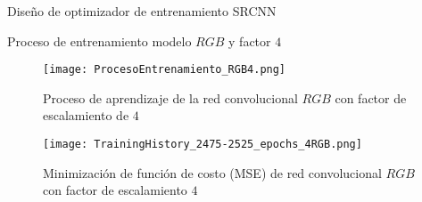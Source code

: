 \begin{frame}{Diseño de optimizador de entrenamiento SRCNN}
    \begin{table}[H]
        \centering
        \caption{Parámetros de entrenamiento del optimizador \textbf{Adam}}
    \end{table}
\end{frame}

\begin{frame}{Proceso de entrenamiento modelo $RGB$ y factor $4$}
    \begin{figure}[H]
        \centering
        \texttt{[image: ProcesoEntrenamiento\_RGB4.png]}
        \caption{Proceso de aprendizaje de la red convolucional $RGB$ con factor de escalamiento de $4$}
        \label{fig:SRCNN_MSE_TrainingProcess4RGB}
    \end{figure}
    \begin{figure}[H]
        \centering
        \texttt{[image: TrainingHistory\_2475-2525\_epochs\_4RGB.png]}
        \caption{Minimización de función de costo (MSE) de red convolucional $RGB$ con factor de escalamiento $4$}
        \label{fig:SRCNN_MSE_TrainingLoss4RGB}
    \end{figure}
\end{frame}


